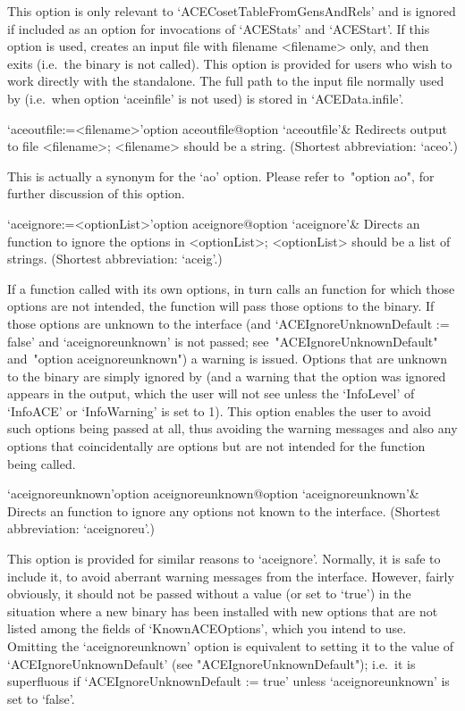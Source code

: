 This option is only relevant to `ACECosetTableFromGensAndRels' and  is
ignored if included as an option for  invocations  of  `ACEStats'  and
`ACEStart'. If this option is used, {\GAP} creates an input file  with
filename <filename> only, and then exits (i.e.~the  {\ACE}  binary  is
not called). This option is  provided  for  users  who  wish  to  work
directly with the {\ACE} standalone. The full path to the  input  file
normally used by {\ACE} (i.e.~when option `aceinfile' is not used)  is
stored in `ACEData.infile'.


\>`aceoutfile:=<filename>'{option aceoutfile}@{option `aceoutfile'}&
Redirects {\ACE} output to file <filename>;  <filename>  should  be  a
string. (Shortest abbreviation: `aceo'.)

This  is  actually  a  synonym  for  the  `ao'  option.  Please  refer
to~"option ao", for further discussion of this option.

\>`aceignore:=<optionList>'{option aceignore}@{option `aceignore'}&
Directs an {\ACE} function to  ignore  the  options  in  <optionList>;
<optionList> should be a list of strings.
(Shortest abbreviation: `aceig'.)

If a function called with its own options, in  turn  calls  an  {\ACE}
function for which those options are not intended, the {\ACE} function
will pass those options to the {\ACE} binary.  If  those  options  are
unknown to  the  {\ACE}  interface  (and  `ACEIgnoreUnknownDefault  :=
false'      and      `aceignoreunknown'      is      not       passed;
see~"ACEIgnoreUnknownDefault" and~"option aceignoreunknown") a warning
is issued. Options that are unknown to the {\ACE}  binary  are  simply
ignored by {\ACE} (and a warning that the option was  ignored  appears
in the  {\ACE}  output,  which  the  user  will  not  see  unless  the
`InfoLevel' of `InfoACE' or `InfoWarning' is set to  1).  This  option
enables the user to avoid such  options  being  passed  at  all,  thus
avoiding the warning messages and also any options that coincidentally
are {\ACE} options but are not intended for the {\ACE} function  being
called.

\>`aceignoreunknown'{option aceignoreunknown}@{option `aceignoreunknown'}&
Directs an {\ACE} function to ignore any  options  not  known  to  the
{\ACE} interface.
(Shortest abbreviation: `aceignoreu'.)

This option is provided for similar reasons to `aceignore'.  Normally,
it is safe to include it, to avoid aberrant warning messages from  the
{\ACE} interface. However, fairly obviously, it should not  be  passed
without a value (or set to `true') in the situation where a new {\ACE}
binary has been installed with new options that are not  listed  among
the fields of `KnownACEOptions', which you intend to use. Omitting the
`aceignoreunknown' option is equivalent to setting it to the value  of
`ACEIgnoreUnknownDefault' (see "ACEIgnoreUnknownDefault"); i.e.~it  is
superfluous    if    `ACEIgnoreUnknownDefault    :=    true'    unless
`aceignoreunknown' is set to `false'.

